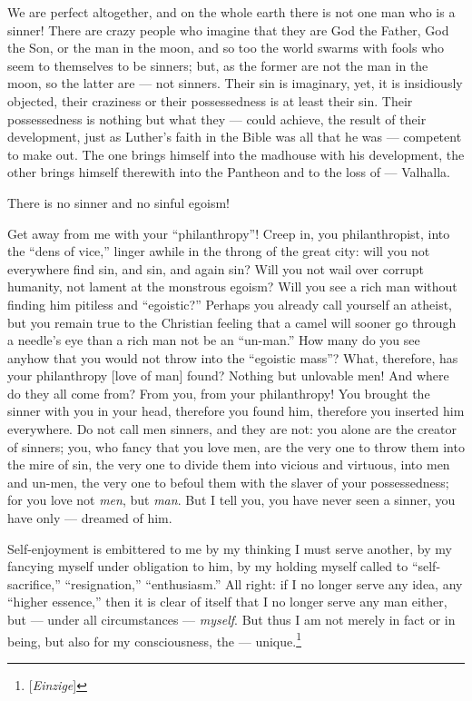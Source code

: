 We are perfect altogether, and on the whole earth there is not one man who is 
a sinner! There are crazy people who imagine that they are God the Father, God 
the Son, or the man in the moon, and so too the world swarms with fools who 
seem to themselves to be sinners; but, as the former are not the man in the 
moon, so the latter are --- not sinners. Their sin is imaginary, yet, it is 
insidiously objected, their craziness or their possessedness is at least their 
sin. Their possessedness is nothing but what they --- could achieve, the result 
of their development, just as Luther's faith in the Bible was all that he was --- competent to make out. The one brings himself into the madhouse with his 
development, the other brings himself therewith into the Pantheon and to the 
loss of --- Valhalla.

There is no sinner and no sinful egoism!

Get away from me with your ``philanthropy''! Creep in, you philanthropist, 
into the ``dens of vice,'' linger awhile in the throng of the great city: 
will you not everywhere find sin, and sin, and again sin? Will you not wail 
over corrupt humanity, not lament at the monstrous egoism? Will you see a rich 
man without finding him pitiless and ``egoistic?'' Perhaps you already call 
yourself an atheist, but you remain true to the Christian feeling that a camel 
will sooner go through a needle's eye than a rich man not be an ``un-man.'' 
How many do you see anyhow that you would not throw into the ``egoistic 
mass''? What, therefore, has your philanthropy [love of man] found? Nothing 
but unlovable men! And where do they all come from? From you, from your 
philanthropy! You brought the sinner with you in your head, therefore you 
found him, therefore you inserted him everywhere. Do not call men sinners, and 
they are not: you alone are the creator of sinners; you, who fancy that you 
love men, are the very one to throw them into the mire of sin, the very one to 
divide them into vicious and virtuous, into men and un-men, the very one to 
befoul them with the slaver of your possessedness; for you love not 
\textit{men}, but \textit{man}. But I tell you, you have never seen a sinner, 
you have only --- dreamed of him.

Self-enjoyment is embittered to me by my thinking I must serve another, by my 
fancying myself under obligation to him, by my holding myself called to 
``self-sacrifice,'' ``resignation,'' ``enthusiasm.'' All right: if I no 
longer serve any idea, any ``higher essence,'' then it is clear of itself 
that I no longer serve any man either, but --- under all circumstances --- \textit{myself}. But thus I am not merely in fact or in being, but also for my 
consciousness, the --- unique.\footnote{[\textit{Einzige}]}

